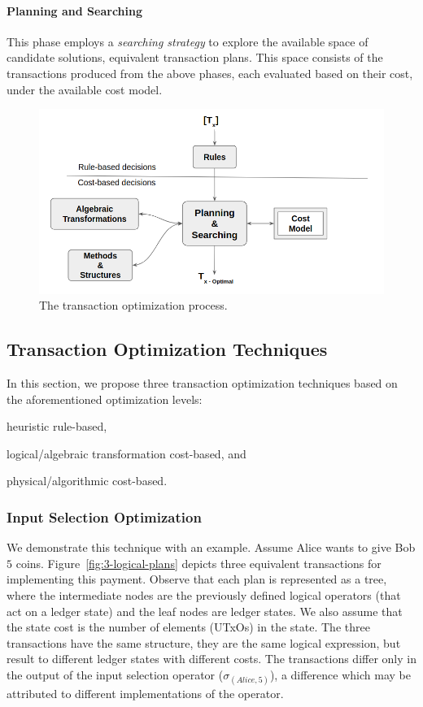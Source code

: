 \paragraph{Planning and Searching}
This phase employs a \emph{searching strategy} to explore the available space
of candidate solutions, \ie equivalent transaction plans. This space consists
of the transactions produced from the above phases, each evaluated based on
their cost, under the available cost model.

\begin{figure}[h!]
	\centering
	\includegraphics[width=0.8\columnwidth,keepaspectratio]{figures/utxo_growth/optimization_phases.png}
	\caption{The transaction optimization process.}
	\label{fig:optimization-phases}
\end{figure}

\subsection{Transaction Optimization Techniques}\label{sec:tx_optimization_techniques}

In this section, we propose three transaction optimization techniques
based on the aforementioned optimization levels:
\begin{inparaenum}[a)]
    \item heuristic rule-based,
    \item logical/algebraic transformation cost-based, and
    \item physical/algorithmic cost-based.
\end{inparaenum}

\subsubsection{Input Selection Optimization}\label{sec:input_sel_optimization}

We demonstrate this technique with an example. Assume Alice wants to give Bob
$5$ coins. Figure~\ref{fig:3-logical-plans} depicts three equivalent
transactions for implementing this payment. Observe that each plan is
represented as a tree, where the intermediate nodes are the previously defined
logical operators (that act on a ledger state) and the leaf nodes are ledger
states. We also assume that the state cost is the number of elements (UTxOs) in
the state.  The three transactions have the same structure, \ie they are the
same logical expression, but result to different ledger states with different
costs. The transactions differ only in the output of the input selection
operator ($\sigma_{(Alice, 5)}$), a difference which may be attributed to
different implementations of the operator.

